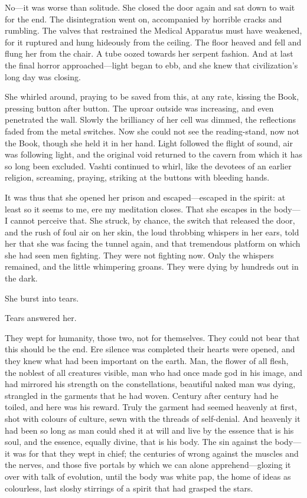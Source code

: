 No---it was worse than solitude. She closed the door again and sat down to wait for the end. The disintegration went on, accompanied by horrible cracks and rumbling. The valves that restrained the Medical Apparatus must have weakened, for it ruptured and hung hideously from the ceiling. The floor heaved and fell and flung her from the chair. A tube oozed towards her serpent fashion. And at last the final horror approached---light began to ebb, and she knew that civilization's long day was closing.

She whirled around, praying to be saved from this, at any rate, kissing the Book, pressing button after button. The uproar outside was increasing, and even penetrated the wall. Slowly the brilliancy of her cell was dimmed, the reflections faded from the metal switches. Now she could not see the reading-stand, now not the Book, though she held it in her hand. Light followed the flight of sound, air was following light, and the original void returned to the cavern from which it has so long been excluded. Vashti continued to whirl, like the devotees of an earlier religion, screaming, praying, striking at the buttons with bleeding hands.

It was thus that she opened her prison and escaped---escaped in the spirit: at least so it seems to me, ere my meditation closes. That she escapes in the body---I cannot perceive that. She struck, by chance, the switch that released the door, and the rush of foul air on her skin, the loud throbbing whispers in her ears, told her that she was facing the tunnel again, and that tremendous platform on which she had seen men fighting. They were not fighting now. Only the whispers remained, and the little whimpering groans. They were dying by hundreds out in the dark.

She burst into tears.

Tears answered her.

They wept for humanity, those two, not for themselves. They could not bear that this should be the end. Ere silence was completed their hearts were opened, and they knew what had been important on the earth. Man, the flower of all flesh, the noblest of all creatures visible, man who had once made god in his image, and had mirrored his strength on the constellations, beautiful naked man was dying, strangled in the garments that he had woven. Century after century had he toiled, and here was his reward. Truly the garment had seemed heavenly at first, shot with colours of culture, sewn with the threads of self-denial. And heavenly it had been so long as man could shed it at will and live by the essence that is his soul, and the essence, equally divine, that is his body. The sin against the body---it was for that they wept in chief; the centuries of wrong against the muscles and the nerves, and those five portals by which we can alone apprehend---glozing it over with talk of evolution, until the body was white pap, the home of ideas as colourless, last sloshy stirrings of a spirit that had grasped the stars.

